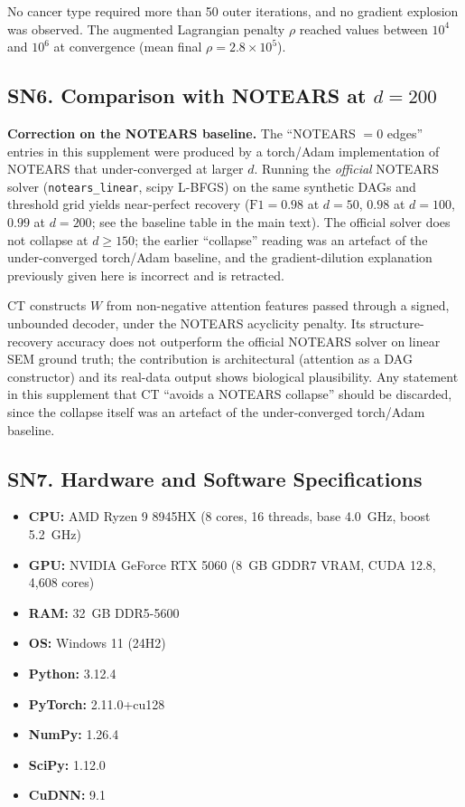 \documentclass[12pt,a4paper]{article}
\begin{document}
No cancer type required more than 50 outer iterations, and no gradient explosion was observed. The augmented Lagrangian penalty $\rho$ reached values between $10^4$ and $10^6$ at convergence (mean final $\rho = 2.8 \times 10^5$).

\subsection*{SN6. Comparison with NOTEARS at $d=200$}

\textbf{Correction on the NOTEARS baseline.} The ``NOTEARS $=0$ edges'' entries in this supplement were produced by a torch/Adam implementation of NOTEARS that under-converged at larger $d$. Running the \emph{official} NOTEARS solver (\texttt{notears\_linear}, scipy L-BFGS) on the same synthetic DAGs and threshold grid yields near-perfect recovery ($\mathrm{F1}=0.98$ at $d=50$, $0.98$ at $d=100$, $0.99$ at $d=200$; see the baseline table in the main text). The official solver does not collapse at $d \ge 150$; the earlier ``collapse'' reading was an artefact of the under-converged torch/Adam baseline, and the gradient-dilution explanation previously given here is incorrect and is retracted.

CT constructs $W$ from non-negative attention features passed through a signed, unbounded decoder, under the NOTEARS acyclicity penalty. Its structure-recovery accuracy does not outperform the official NOTEARS solver on linear SEM ground truth; the contribution is architectural (attention as a DAG constructor) and its real-data output shows biological plausibility. Any statement in this supplement that CT ``avoids a NOTEARS collapse'' should be discarded, since the collapse itself was an artefact of the under-converged torch/Adam baseline.

\subsection*{SN7. Hardware and Software Specifications}

\begin{itemize}[leftmargin=*,itemsep=2pt]
    \item \textbf{CPU:} AMD Ryzen 9 8945HX (8 cores, 16 threads, base 4.0~GHz, boost 5.2~GHz)
    \item \textbf{GPU:} NVIDIA GeForce RTX 5060 (8~GB GDDR7 VRAM, CUDA 12.8, 4,608 cores)
    \item \textbf{RAM:} 32~GB DDR5-5600
    \item \textbf{OS:} Windows 11 (24H2)
    \item \textbf{Python:} 3.12.4
    \item \textbf{PyTorch:} 2.11.0+cu128
    \item \textbf{NumPy:} 1.26.4
    \item \textbf{SciPy:} 1.12.0
    \item \textbf{CuDNN:} 9.1
\end{itemize}
\end{document}
